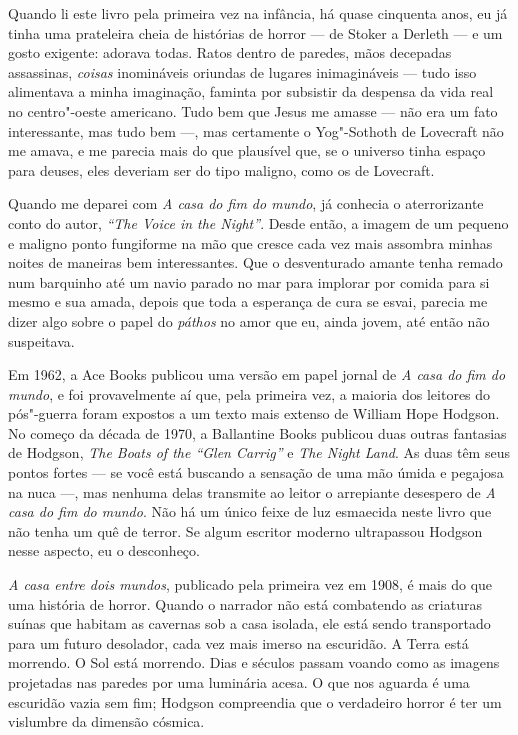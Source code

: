 Quando li este livro pela primeira vez na infância, há quase cinquenta anos, eu já tinha uma prateleira cheia de
histórias de horror --- de Stoker a Derleth --- e um gosto exigente: adorava todas. Ratos dentro de paredes, mãos decepadas
assassinas, \textit{coisas} inomináveis oriundas de lugares inimagináveis --- tudo isso alimentava a minha imaginação,
faminta por subsistir da despensa da vida real no centro"-oeste americano. Tudo bem que Jesus me amasse --- não era um
fato interessante, mas tudo bem ---, mas certamente o Yog"-Sothoth de Lovecraft não me amava, e me parecia mais do que
plausível que, se o universo tinha espaço para deuses, eles deveriam ser do tipo maligno, como os de Lovecraft.

Quando me deparei com \textit{A casa do fim do mundo}, já conhecia o aterrorizante conto do autor, \textit{“The Voice
in the Night”}. Desde então, a imagem de um pequeno e maligno ponto fungiforme na mão que cresce cada vez mais assombra
minhas noites de maneiras bem interessantes. Que o desventurado amante tenha remado num barquinho até um navio parado
no mar para implorar por comida para si mesmo e sua amada, depois que toda a esperança de cura se esvai, parecia me
dizer algo sobre o papel do \textit{páthos} no amor que eu, ainda jovem, até então não suspeitava.

Em 1962, a Ace Books publicou uma versão em papel jornal de \textit{A casa do fim do mundo}, e foi provavelmente aí
que, pela primeira vez, a maioria dos leitores do pós"-guerra foram expostos a um texto mais extenso de William Hope
Hodgson. No começo da década de 1970, a Ballantine Books publicou duas outras fantasias de Hodgson, \textit{The Boats
of the “Glen Carrig”} e \textit{The Night Land}. As duas têm seus pontos fortes --- se você está buscando a sensação de
uma mão úmida e pegajosa na nuca ---, mas nenhuma delas transmite ao leitor o arrepiante desespero de \textit{A casa do
fim do mundo}. Não há um único feixe de luz esmaecida neste livro que não tenha um quê de terror. Se algum escritor
moderno ultrapassou Hodgson nesse aspecto, eu o desconheço.

\textit{A casa entre dois mundos}, publicado pela primeira vez em 1908, é mais do que uma história de horror. Quando o
narrador não está combatendo as criaturas suínas que habitam as cavernas sob a casa isolada, ele está sendo
transportado para um futuro desolador, cada vez mais imerso na escuridão. A Terra está morrendo. O Sol está morrendo. Dias e
séculos passam voando como as imagens projetadas nas paredes por uma luminária acesa. O que nos aguarda é uma escuridão
vazia sem fim; Hodgson compreendia que o verdadeiro horror é ter um vislumbre da dimensão cósmica.

